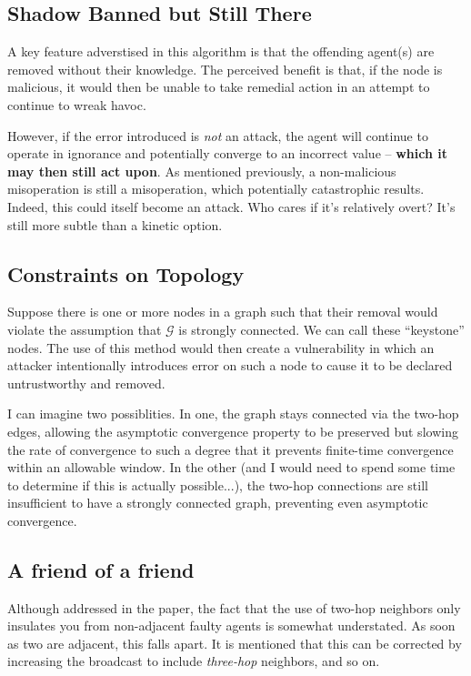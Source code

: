 \documentclass[11pt]{article}
\begin{document}
\subsection{Shadow Banned but Still There}
A key feature adverstised in this algorithm is that the offending agent(s) are
removed without their knowledge. The perceived benefit is that, if the node is
malicious, it would then be unable to take remedial action in an attempt to
continue to wreak havoc.

However, if the error introduced is \textit{not} an attack, the agent will
continue to operate in ignorance and potentially converge to an incorrect value
-- \textbf{which it may then still act upon}. As mentioned previously, a
non-malicious misoperation is still a misoperation, which potentially
catastrophic results. Indeed, this could itself become an attack. Who cares
if it's relatively overt? It's still more subtle than a kinetic option.

\subsection{Constraints on Topology}
Suppose there is one or more nodes in a graph such that their removal
would violate the assumption that $\mathcal{G}$ is strongly connected.
We can call these ``keystone'' nodes. The use of this method would then
create a vulnerability in which an attacker intentionally introduces
error on such a node to cause it to be declared untrustworthy and removed.

I can imagine two possiblities. In one, the graph stays connected via the
two-hop edges, allowing the asymptotic convergence property to be preserved but
slowing the rate of convergence to such a degree that it prevents finite-time
convergence within an allowable window. In the other (and I would need to spend
some time to determine if this is actually possible...), the two-hop connections
are still insufficient to have a strongly connected graph, preventing
even asymptotic convergence.


\subsection{A friend of a friend}
Although addressed in the paper, the fact  that the use of two-hop neighbors
only insulates you from non-adjacent faulty agents is somewhat understated. As
soon as two are adjacent, this falls apart. It is mentioned that this can be
corrected by increasing the broadcast to include \textit{three-hop} neighbors,
and so on.
\end{document}
